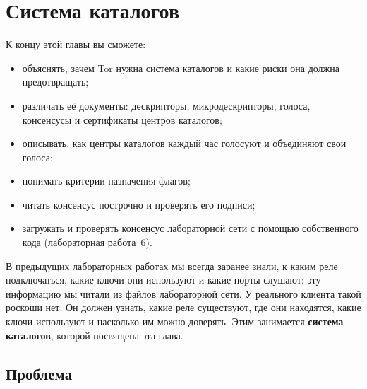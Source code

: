 \chapter{Система каталогов}\label{cap:12-directory}

\begin{obiettivi}
К концу этой главы вы сможете:
\begin{itemize}[nosep]
  \item объяснять, зачем Tor нужна система каталогов и какие риски она должна предотвращать;
  \item различать её документы: дескрипторы, микродескрипторы, голоса, консенсусы и сертификаты центров каталогов;
  \item описывать, как центры каталогов каждый час голосуют и объединяют свои голоса;
  \item понимать критерии назначения флагов;
  \item читать консенсус построчно и проверять его подписи;
  \item загружать и проверять консенсус лабораторной сети с помощью собственного кода (лабораторная работа~6).
\end{itemize}
\end{obiettivi}

В предыдущих лабораторных работах мы всегда заранее знали, к каким реле подключаться, какие ключи они используют и какие порты слушают: эту информацию мы читали из файлов лабораторной сети. У реального клиента такой роскоши нет. Он должен узнать, какие реле существуют, где они находятся, какие ключи используют и насколько им можно доверять. Этим занимается \textbf{система каталогов}, которой посвящена эта глава.

\section{Проблема}\label{sec:dir-problema}

